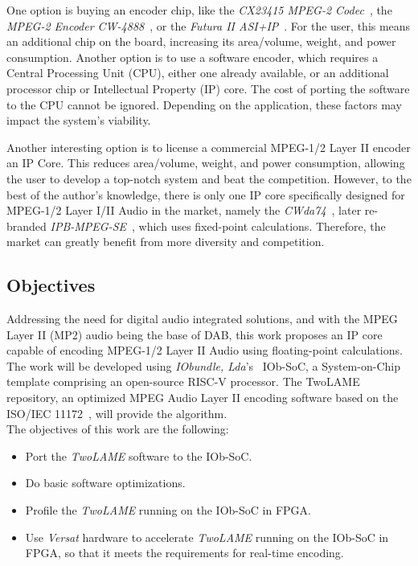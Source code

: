 One option is buying an encoder chip, like the \textit{CX23415 MPEG-2 Codec}~\cite{cx23415}, the \textit{MPEG-2 Encoder CW-4888}~\cite{cw4888}, or the \textit{Futura II ASI+IP}~\cite{futura}. For the user, this means an additional chip on the board, increasing its area/volume, weight, and power consumption. Another option is to use a software encoder, which requires a Central Processing Unit (CPU), either one already available, or an additional processor chip or Intellectual Property (IP) core. The cost of porting the software to the CPU cannot be ignored. Depending on the application, these factors may impact the system's viability.

Another interesting option is to license a commercial MPEG-1/2 Layer II encoder an IP Core. This reduces area/volume, weight, and power consumption, allowing the user to develop a top-notch system and beat the competition. However, to the best of the author's knowledge, there is only one IP core specifically designed for MPEG-1/2 Layer I/II Audio in the market, namely the \textit{CWda74}~\cite{CWda74}, later re-branded \textit{IPB-MPEG-SE}~\cite{ipb-mpeg-se}, which uses fixed-point calculations. Therefore, the market can greatly benefit from more diversity and competition.

\subsection{Objectives}

Addressing the need for digital audio integrated solutions, and with the MPEG Layer II (MP2) audio being the base of DAB, this work proposes an IP core capable of encoding MPEG-1/2 Layer II Audio using floating-point calculations.
The work will be developed using \textit{IObundle, Lda}'s~\cite{iobundle} IOb-SoC, a System-on-Chip template comprising an open-source RISC-V processor. The TwoLAME~\cite{twolame} repository, an optimized MPEG Audio Layer II encoding software based on the ISO/IEC 11172~\cite{11172}, will provide the algorithm.\\
The objectives of this work are the following:

\begin{itemize}
    \item Port the \textit{TwoLAME} software to the IOb-SoC.
    \item Do basic software optimizations.
    \item Profile the \textit{TwoLAME} running on the IOb-SoC in FPGA.
    \item Use \textit{Versat} hardware to accelerate \textit{TwoLAME} running on the IOb-SoC in FPGA, so that it meets the requirements for real-time encoding.
\end{itemize}

